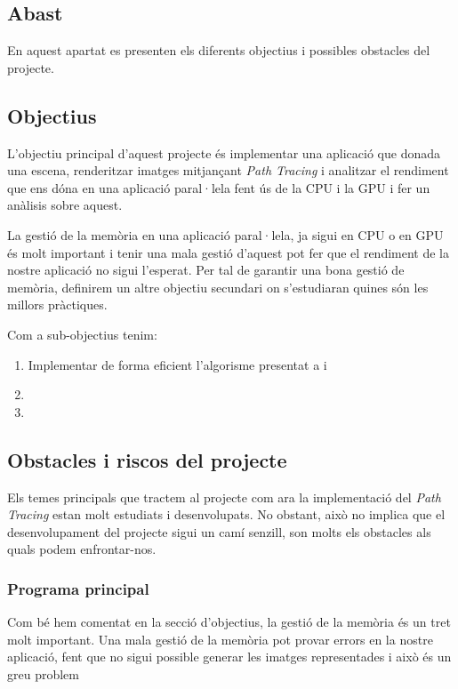 \documentclass[a4paper,titlepage]{article}
\begin{document}
\subsection{Abast}

En aquest apartat es presenten els diferents objectius i possibles obstacles del projecte.

\subsection{Objectius}

L'objectiu principal d'aquest projecte és implementar una aplicació que donada una escena, renderitzar imatges mitjançant \textit{Path Tracing} i analitzar el rendiment que ens dóna en una  aplicació paral·lela fent ús de la CPU i la GPU i fer un anàlisis sobre aquest.

La gestió de la memòria en una aplicació paral·lela, ja sigui en CPU o en GPU és molt important i tenir una mala gestió d'aquest pot fer que el rendiment de la nostre aplicació no sigui l'esperat. Per tal de garantir una bona gestió de memòria, definirem un altre objectiu secundari on s'estudiaran quines són les millors pràctiques.

Com a sub-objectius tenim:

\begin{enumerate}
	\item Implementar de forma eficient l'algorisme presentat a \citep{Shirley2018a} i \cite{Karras2012}
	\item 
	\item
\end{enumerate}

\subsection{Obstacles i riscos del projecte}

Els temes principals que tractem al projecte com ara la implementació del \textit{Path Tracing} estan molt estudiats i desenvolupats. No obstant, això no implica que el desenvolupament del projecte sigui un camí senzill, son molts els obstacles als quals podem enfrontar-nos.

\subsubsection{Programa principal}

Com bé hem comentat en la secció d'objectius, la gestió de la memòria és un tret molt important. Una mala gestió de la memòria pot provar errors en la nostre aplicació, fent que no sigui possible generar les imatges representades i això és un greu problem
\end{document}
